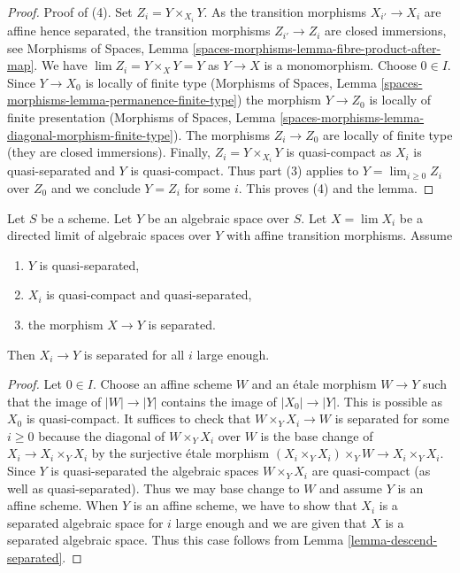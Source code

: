 \begin{proof}
\medskip\noindent
Proof of (4). Set $Z_i = Y \times_{X_i} Y$.
As the transition morphisms $X_{i'} \to X_i$ are affine hence separated,
the transition morphisms $Z_{i'} \to Z_i$ are closed immersions, see
Morphisms of Spaces, Lemma
\ref{spaces-morphisms-lemma-fibre-product-after-map}.
We have $\lim Z_i = Y \times_X Y = Y$ as $Y \to X$ is a monomorphism.
Choose $0 \in I$. Since $Y \to X_0$ is locally of finite type
(Morphisms of Spaces, Lemma
\ref{spaces-morphisms-lemma-permanence-finite-type})
the morphism $Y \to Z_0$ is locally of finite presentation
(Morphisms of Spaces, Lemma
\ref{spaces-morphisms-lemma-diagonal-morphism-finite-type}).
The morphisms $Z_i \to Z_0$ are locally of finite type
(they are closed immersions).
Finally, $Z_i = Y \times_{X_i} Y$ is quasi-compact as
$X_i$ is quasi-separated and $Y$ is quasi-compact.
Thus part (3) applies to $Y = \lim_{i \geq 0} Z_i$ over $Z_0$
and we conclude $Y = Z_i$ for some $i$. This proves (4) and the lemma.
\end{proof}

\begin{lemma}
\label{lemma-eventually-separated}
Let $S$ be a scheme. Let $Y$ be an algebraic space over $S$.
Let $X = \lim X_i$ be a directed limit of algebraic spaces over $Y$
with affine transition morphisms. Assume
\begin{enumerate}
\item $Y$ is quasi-separated,
\item $X_i$ is quasi-compact and quasi-separated,
\item the morphism $X \to Y$ is separated.
\end{enumerate}
Then $X_i \to Y$ is separated for all $i$ large enough.
\end{lemma}

\begin{proof}
Let $0 \in I$. Choose an affine scheme $W$ and an \'etale morphism
$W \to Y$ such that the image of $|W| \to |Y|$ contains the image of
$|X_0| \to |Y|$. This is possible as $X_0$ is quasi-compact.
It suffices to check that $W \times_Y X_i \to W$ is separated
for some $i \geq 0$ because the diagonal of $W \times_Y X_i$
over $W$ is the base change of $X_i \to X_i \times_Y X_i$ by
the surjective \'etale morphism $(X_i \times_Y X_i) \times_Y W \to
X_i \times_Y X_i$. Since $Y$ is quasi-separated the algebraic spaces
$W \times_Y X_i$ are quasi-compact (as well as quasi-separated).
Thus we may base change to $W$ and assume $Y$ is an affine scheme.
When $Y$ is an affine scheme, we have to show that $X_i$ is a
separated algebraic space for $i$ large enough and we are given that
$X$ is a separated algebraic space. Thus this case follows from
Lemma \ref{lemma-descend-separated}.
\end{proof}












